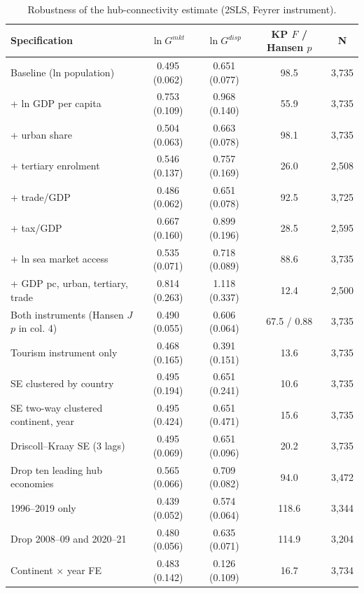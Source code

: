\begin{table}[H]\centering\caption{Robustness of the hub-connectivity estimate (2SLS, Feyrer instrument).}\label{tab:robust}
\begin{threeparttable}\small\begin{tabular}{lcccc}
\toprule
Specification & $\ln G^{mkt}$ & $\ln G^{disp}$ & KP $F$ / Hansen $p$ & N \\
\midrule
Baseline (ln population) & 0.495\sym{***} (0.062) & 0.651\sym{***} (0.077) & 98.5 & 3,735 \\
+ ln GDP per capita & 0.753\sym{***} (0.109) & 0.968\sym{***} (0.140) & 55.9 & 3,735 \\
+ urban share & 0.504\sym{***} (0.063) & 0.663\sym{***} (0.078) & 98.1 & 3,735 \\
+ tertiary enrolment & 0.546\sym{***} (0.137) & 0.757\sym{***} (0.169) & 26.0 & 2,508 \\
+ trade/GDP & 0.486\sym{***} (0.062) & 0.651\sym{***} (0.078) & 92.5 & 3,725 \\
+ tax/GDP & 0.667\sym{***} (0.160) & 0.899\sym{***} (0.196) & 28.5 & 2,595 \\
+ ln sea market access & 0.535\sym{***} (0.071) & 0.718\sym{***} (0.089) & 88.6 & 3,735 \\
+ GDP pc, urban, tertiary, trade & 0.814\sym{***} (0.263) & 1.118\sym{***} (0.337) & 12.4 & 2,500 \\
Both instruments (Hansen $J$ $p$ in col. 4) & 0.490\sym{***} (0.055) & 0.606\sym{***} (0.064) & 67.5 / 0.88 & 3,735 \\
Tourism instrument only & 0.468\sym{***} (0.165) & 0.391\sym{***} (0.151) & 13.6 & 3,735 \\
SE clustered by country & 0.495\sym{**} (0.194) & 0.651\sym{***} (0.241) & 10.6 & 3,735 \\
SE two-way clustered continent, year & 0.495 (0.424) & 0.651 (0.471) & 15.6 & 3,735 \\
Driscoll--Kraay SE (3 lags) & 0.495\sym{***} (0.069) & 0.651\sym{***} (0.096) & 20.2 & 3,735 \\
Drop ten leading hub economies & 0.565\sym{***} (0.066) & 0.709\sym{***} (0.082) & 94.0 & 3,472 \\
1996--2019 only & 0.439\sym{***} (0.052) & 0.574\sym{***} (0.064) & 118.6 & 3,344 \\
Drop 2008--09 and 2020--21 & 0.480\sym{***} (0.056) & 0.635\sym{***} (0.071) & 114.9 & 3,204 \\
Continent $\times$ year FE & 0.483\sym{***} (0.142) & 0.126 (0.109) & 16.7 & 3,734 \\

\end{tabular}
\end{threeparttable}
\end{table}
